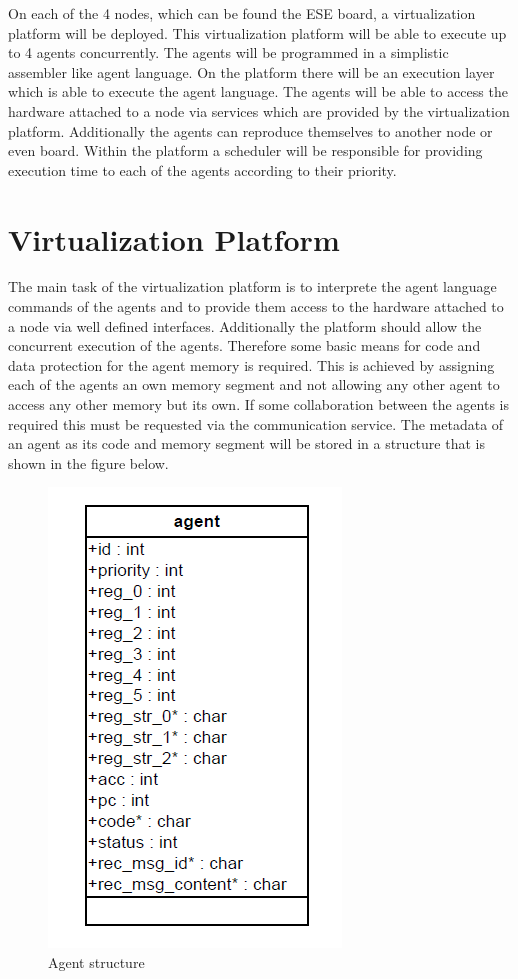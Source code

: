 \documentclass{scrreprt}
\begin{document}
On each of the 4 nodes, which can be found the ESE board, a virtualization platform will be deployed. 
This virtualization platform will be able to execute up to 4 agents concurrently. The agents will be 
programmed in a simplistic assembler like agent language. On the platform there will be an execution 
layer which is able to execute the agent language. The agents will be able to access the hardware attached
to a node via services which are provided by the virtualization platform. Additionally the agents can
reproduce themselves to another node or even board. Within the platform a scheduler will be responsible for
providing execution time to each of the agents according to their priority. 

\section{Virtualization Platform}
The main task of the virtualization platform is to interprete the agent language commands of the agents 
and to provide them access to the hardware attached to a node via well defined interfaces. Additionally 
the platform should allow the concurrent execution of the agents. Therefore some basic means for code and 
data protection for the agent memory is required. This is achieved by assigning each of the agents an own 
memory segment and not allowing any other agent to access any other memory but its own. If some collaboration 
between the agents is required this must be requested via the communication service. The metadata of an agent 
as its code and memory segment will be stored in a structure that is shown in the figure below. 


\begin{figure}[!htbp]
\begin{center}
\includegraphics[scale=0.4]{figures/agent.png}
\caption{Agent structure}
\end{center}
\label{agent}
\end{figure}
\end{document}
